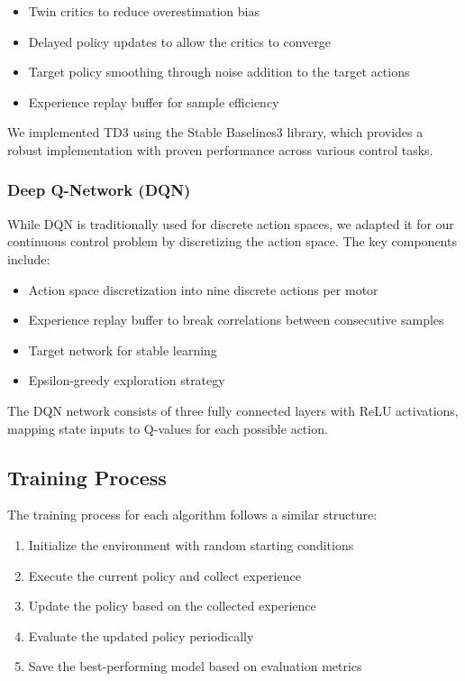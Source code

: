 \documentclass[12pt]{article}
\begin{document}
\begin{itemize}
    \item Twin critics to reduce overestimation bias
    \item Delayed policy updates to allow the critics to converge
    \item Target policy smoothing through noise addition to the target actions
    \item Experience replay buffer for sample efficiency
\end{itemize}

We implemented TD3 using the Stable Baselines3 library, which provides a robust implementation with proven performance across various control tasks.

\subsubsection{Deep Q-Network (DQN)}

While DQN is traditionally used for discrete action spaces, we adapted it for our continuous control problem by discretizing the action space. The key components include:

\begin{itemize}
    \item Action space discretization into nine discrete actions per motor
    \item Experience replay buffer to break correlations between consecutive samples
    \item Target network for stable learning
    \item Epsilon-greedy exploration strategy
\end{itemize}

The DQN network consists of three fully connected layers with ReLU activations, mapping state inputs to Q-values for each possible action.

\subsection{Training Process}

The training process for each algorithm follows a similar structure:

\begin{enumerate}
    \item Initialize the environment with random starting conditions
    \item Execute the current policy and collect experience
    \item Update the policy based on the collected experience
    \item Evaluate the updated policy periodically
    \item Save the best-performing model based on evaluation metrics
\end{enumerate}
\end{document}
